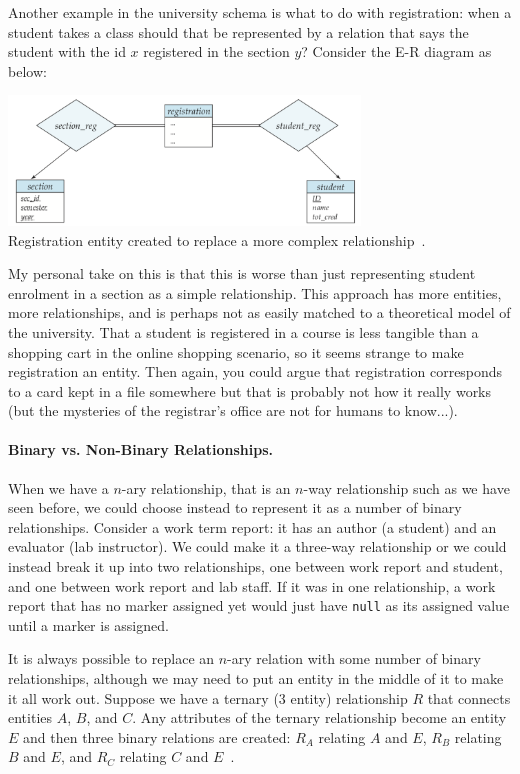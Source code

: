 Another example in the university schema is what to do with registration: when a student takes a class should that be represented by a relation that says the student with the id $x$ registered in the section $y$? Consider the E-R diagram as below:

\begin{center}
	\includegraphics[width=0.7\textwidth]{images/reg-split}\\
	Registration entity created to replace a more complex relationship~\cite{dsc}.
\end{center}

My personal take on this is that this is worse than just representing student enrolment in a section as a simple relationship. This approach has more entities, more relationships, and is perhaps not as easily matched to a theoretical model of the university. That a student is registered in a course is less tangible than a shopping cart in the online shopping scenario, so it seems strange to make registration an entity. Then again, you could argue that registration corresponds to a card kept in a file somewhere but that is probably not how it really works (but the mysteries of the registrar's office are not for humans to know...).

\paragraph{Binary vs. Non-Binary Relationships.}
When we have a $n$-ary relationship, that is an $n$-way relationship such as we have seen before, we could choose instead to represent it as a number of binary relationships. Consider a work term report: it has an author (a student) and an evaluator (lab instructor). We could make it a three-way relationship or we could instead break it up into two relationships, one between work report and student, and one between work report and lab staff. If it was in one relationship, a work report that has no marker assigned yet would just have \texttt{null} as its assigned value until a marker is assigned.  

It is always possible to replace an $n$-ary relation with some number of binary relationships, although we may need to put an entity in the middle of it to make it all work out. Suppose we have a ternary (3 entity) relationship $R$ that connects entities $A$, $B$, and $C$. Any attributes of the ternary relationship become an entity $E$ and then three binary relations are created: $R_{A}$ relating $A$ and $E$, $R_{B}$ relating $B$ and $E$, and $R_{C}$ relating $C$ and $E$~\cite{dsc}.

